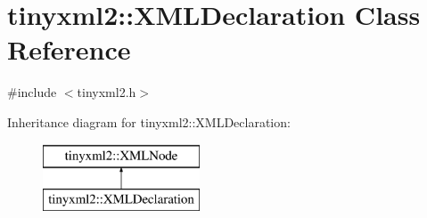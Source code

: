 \hypertarget{classtinyxml2_1_1_x_m_l_declaration}{}\section{tinyxml2\+:\+:X\+M\+L\+Declaration Class Reference}
\label{classtinyxml2_1_1_x_m_l_declaration}


{\ttfamily \#include $<$tinyxml2.\+h$>$}

Inheritance diagram for tinyxml2\+:\+:X\+M\+L\+Declaration\+:\begin{figure}[H]
\begin{center}
\leavevmode
\includegraphics[height=2.000000cm]{classtinyxml2_1_1_x_m_l_declaration}
\end{center}
\end{figure}
